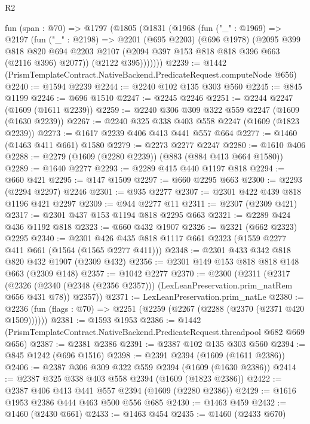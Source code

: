 \begin{lexlean}{R2}
\begin{coremodule}
    fun (span : @70) =>
    @1797
      (@1805
        (@1831
          (@1968
            (fun ("_" : @1969) =>
            @2197
              (fun ("_" : @2198) =>
              @2201
                (@695 @2203)
                (@696 @1978)
                (@2095
                  @399
                  @818
                  @820
                  @694
                  @2203
                  @2107
                  (@2094 @397 @153 @818 @818 @396 @663 (@2116 @396) @2077))
                (@2122 @395)))))))
@2239 := @1442 (PrismTemplateContract.NativeBackend.PredicateRequest.computeNode @656)
@2240 := @1594 @2239
@2244 := @2240 @102 @135 @303 @560
@2245 := @845 @1199
@2246 := @696 @1510
@2247 := @2245 @2246
@2251 := @2244 @2247 (@1609 (@1611 @2239))
@2259 := @2240 @306 @309 @322 @559 @2247 (@1609 (@1630 @2239))
@2267 := @2240 @325 @338 @403 @558 @2247 (@1609 (@1823 @2239))
@2273 := @1617 @2239 @406 @413 @441 @557 @664
@2277 := @1460 (@1463 @411 @661) @1580
@2279 := @2273 @2277 @2247
@2280 := @1610 @406
@2288 := @2279 (@1609 (@2280 @2239)) (@883 (@884 @413 @664 @1580))
@2289 := @1640 @2277
@2293 := @2289 @415 @440 @1197 @818
@2294 := @660 @421
@2295 := @147 @1509
@2297 := @660 @2295 @663
@2300 := @2293 (@2294 @2297) @2246
@2301 := @935 @2277
@2307 := @2301 @422 @439 @818 @1196 @421 @2297
@2309 := @944 @2277 @11
@2311 := @2307 (@2309 @421)
@2317 := @2301 @437 @153 @1194 @818 @2295 @663
@2321 := @2289 @424 @436 @1192 @818
@2323 := @660 @432 @1907
@2326 := @2321 (@662 @2323) @2295
@2340 := @2301 @426 @435 @818 @1117 @661 @2323 (@1559 @2277 @411 @661 (@1564 (@1565 @2277 @411)))
@2348 := @2301 @433 @342 @818 @820 @432 @1907 (@2309 @432)
@2356 := @2301 @149 @153 @818 @818 @148 @663 (@2309 @148)
@2357 := @1042 @2277
@2370 := @2300
    (@2311
      (@2317
        (@2326 (@2340 (@2348 (@2356 @2357))) (LexLeanPreservation.prim_natRem @656 @431 @78))
        @2357))
@2371 := LexLeanPreservation.prim_natLe
@2380 := @2236 (fun (flags : @70) => @2251 (@2259 (@2267 (@2288 (@2370 (@2371 @420 @1509))))))
@2381 := @1593 @1953
@2386 := @1442 (PrismTemplateContract.NativeBackend.PredicateRequest.threadpool @682 @669 @656)
@2387 := @2381 @2386
@2391 := @2387 @102 @135 @303 @560
@2394 := @845 @1242 (@696 @1516)
@2398 := @2391 @2394 (@1609 (@1611 @2386))
@2406 := @2387 @306 @309 @322 @559 @2394 (@1609 (@1630 @2386))
@2414 := @2387 @325 @338 @403 @558 @2394 (@1609 (@1823 @2386))
@2422 := @2387 @406 @413 @441 @557 @2394 (@1609 (@2280 @2386))
@2429 := @1616 @1953 @2386 @444 @463 @500 @556 @685
@2430 := @1463 @459
@2432 := @1460 (@2430 @661)
@2433 := @1463 @454
@2435 := @1460 (@2433 @670)

\end{coremodule}
\end{lexlean}

